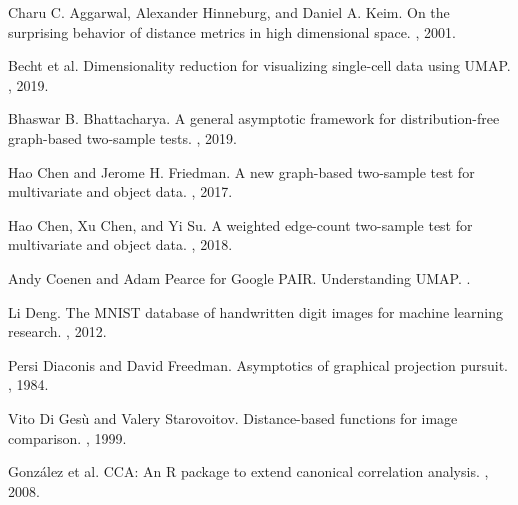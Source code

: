 \documentclass{article}
\begin{document}
\newpage

\begin{thebibliography}{99}

Charu C. Aggarwal, Alexander Hinneburg, and Daniel A. Keim.
\newblock On the surprising behavior of distance metrics in high dimensional space.
, 2001.

Becht et al.
\newblock Dimensionality reduction for visualizing single-cell data using UMAP.
, 2019.

Bhaswar B. Bhattacharya.
\newblock A general asymptotic framework for distribution-free graph-based two-sample tests.
, 2019.

Hao Chen and Jerome H. Friedman.
\newblock A new graph-based two-sample test for multivariate and object data.
, 2017.

Hao Chen, Xu Chen, and Yi Su.
\newblock A weighted edge-count two-sample test for multivariate and object data.
, 2018.

Andy Coenen and Adam Pearce for Google PAIR.
\newblock Understanding UMAP.
.

Li Deng.
\newblock The MNIST database of handwritten digit images for machine learning research.
, 2012.

Persi Diaconis and David Freedman.
\newblock Asymptotics of graphical projection pursuit.
, 1984.

Vito Di Ges\`u and Valery Starovoitov.
\newblock Distance-based functions for image comparison.
, 1999.

Gonz\'alez et al.
\newblock CCA: An R package to extend canonical correlation analysis.
, 2008.


\end{thebibliography}
\end{document}
